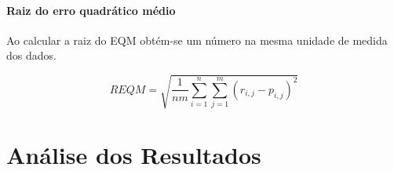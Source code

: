 \documentclass[12pt,a4paper,header]{abnt}
\begin{document}
\subsubsection{Raiz do erro quadrático médio}

Ao calcular a raiz do EQM obtém-se um número na mesma unidade de medida dos dados.

\begin{equation}
REQM = \sqrt{\frac{1}{nm} \sum_{i=1}^{n} \sum_{j=1}^m \left( r_{i,j} - p_{i,j}  \right)^2}
\end{equation}


% 
% 
% 
% 
% 
% 
% 
% 

\chapter{Análise dos Resultados}
\end{document}
